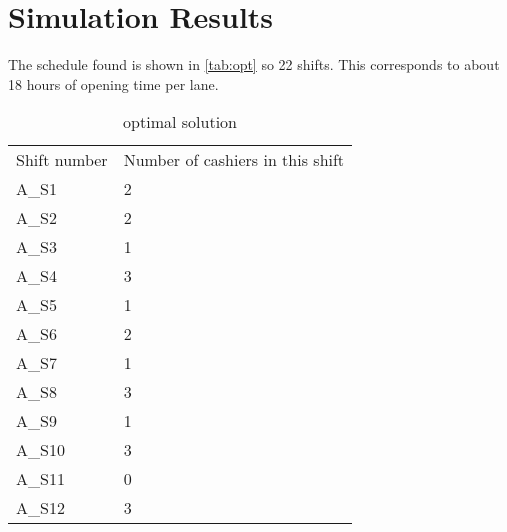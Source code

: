 \section{Simulation Results}
The schedule found is shown in \autoref{tab:opt} so 22 shifts.
This corresponds to about 18 hours of opening time per lane.

\begin{table}
	\centering
	\caption{optimal solution}
	\begin{tabular}{l | l}
		Shift number & Number of cashiers in this shift\\
		A\_S1 & 2 \\
		A\_S2 & 2 \\
		A\_S3 & 1 \\
		A\_S4 & 3 \\
		A\_S5 & 1 \\
		A\_S6 & 2 \\
		A\_S7 & 1 \\
		A\_S8 & 3 \\
		A\_S9 & 1 \\
		A\_S10 & 3 \\
		A\_S11 & 0 \\
		A\_S12 & 3 \\
	\end{tabular}
	\label{tab:opt}
\end{table}

\newcommand{\cc}{\cellcolor{cyan}}


